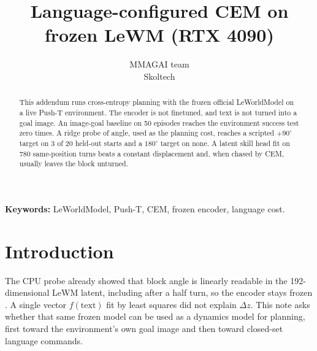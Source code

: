 \documentclass[11pt,a4paper]{article}
\title{Language-configured CEM on frozen LeWM (RTX 4090)}
\author{MMAGAI team\\Skoltech}
\date{}
\begin{document}
\maketitle

\begin{abstract}
This addendum runs cross-entropy planning with the frozen official LeWorldModel on a live Push-T environment.
The encoder is not finetuned, and text is not turned into a goal image.
An image-goal baseline on 50 episodes reaches the environment success test zero times.
A ridge probe of angle, used as the planning cost, reaches a scripted $+90^{\circ}$ target on 3 of 20 held-out starts and a $180^{\circ}$ target on none.
A latent skill head fit on 780 same-position turns beats a constant displacement and, when chased by CEM, usually leaves the block unturned.
\end{abstract}

\noindent\textbf{Keywords:}
LeWorldModel, Push-T, CEM, frozen encoder, language cost.

\section{Introduction}
\label{sec:intro}
The CPU probe already showed that block angle is linearly readable in the 192-dimensional LeWM latent, including after a half turn, so the encoder stays frozen \citep{maes2026lewm}.
A single vector $f(\mathrm{text})$ fit by least squares did not explain $\Delta z$.
This note asks whether that same frozen model can be used as a dynamics model for planning, first toward the environment's own goal image and then toward closed-set language commands.
\end{document}
